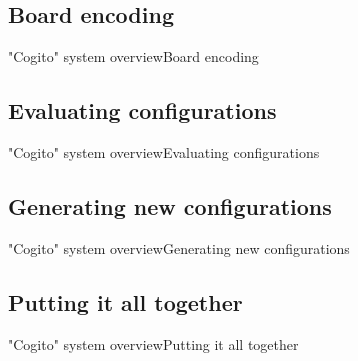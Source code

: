 \subsection{Board encoding}
\begin{frame}{"Cogito" system overview}{Board encoding}
\end{frame}

\subsection{Evaluating configurations}
\begin{frame}{"Cogito" system overview}{Evaluating configurations}
\end{frame}

\subsection{Generating new configurations}
\begin{frame}{"Cogito" system overview}{Generating new configurations}
\end{frame}

\subsection{Putting it all together}
\begin{frame}{"Cogito" system overview}{Putting it all together}
\end{frame}